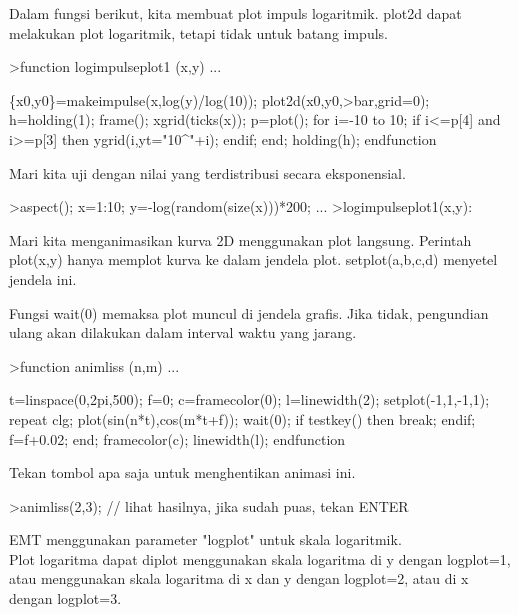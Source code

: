 \documentclass[a4paper,10pt]{article}
\begin{document}
\begin{eulernotebook}
\begin{eulercomment}
\begin{eulercomment}
\begin{eulercomment}
\begin{eulercomment}
\begin{eulercomment}
\begin{eulercomment}
\begin{eulercomment}
\begin{eulercomment}
\begin{eulercomment}
Dalam fungsi berikut, kita membuat plot impuls logaritmik. plot2d
dapat melakukan plot logaritmik, tetapi tidak untuk batang impuls.
\end{eulercomment}
\begin{eulerprompt}
>function logimpulseplot1 (x,y) ...
\end{eulerprompt}
\begin{eulerudf}
    \{x0,y0\}=makeimpulse(x,log(y)/log(10));
    plot2d(x0,y0,>bar,grid=0);
    h=holding(1);
    frame();
    xgrid(ticks(x));
    p=plot();
    for i=-10 to 10;
      if i<=p[4] and i>=p[3] then
         ygrid(i,yt="10^"+i);
      endif;
    end;
    holding(h);
  endfunction
\end{eulerudf}
\begin{eulercomment}
Mari kita uji dengan nilai yang terdistribusi secara eksponensial.
\end{eulercomment}
\begin{eulerprompt}
>aspect(); x=1:10; y=-log(random(size(x)))*200; ...
>logimpulseplot1(x,y):
\end{eulerprompt}
\begin{eulercomment}
Mari kita menganimasikan kurva 2D menggunakan plot langsung. Perintah
plot(x,y) hanya memplot kurva ke dalam jendela plot. setplot(a,b,c,d)
menyetel jendela ini.

Fungsi wait(0) memaksa plot muncul di jendela grafis. Jika tidak,
pengundian ulang akan dilakukan dalam interval waktu yang jarang.
\end{eulercomment}
\begin{eulerprompt}
>function animliss (n,m) ...
\end{eulerprompt}
\begin{eulerudf}
  t=linspace(0,2pi,500);
  f=0;
  c=framecolor(0);
  l=linewidth(2);
  setplot(-1,1,-1,1);
  repeat
    clg;
    plot(sin(n*t),cos(m*t+f));
    wait(0);
    if testkey() then break; endif;
    f=f+0.02;
  end;
  framecolor(c);
  linewidth(l);
  endfunction
\end{eulerudf}
\begin{eulercomment}
Tekan tombol apa saja untuk menghentikan animasi ini.
\end{eulercomment}
\begin{eulerprompt}
>animliss(2,3); // lihat hasilnya, jika sudah puas, tekan ENTER
\end{eulerprompt}
\begin{eulercomment}
EMT menggunakan parameter "logplot" untuk skala logaritmik.\\
Plot logaritma dapat diplot menggunakan skala logaritma di y dengan
logplot=1, atau menggunakan skala logaritma di x dan y dengan
logplot=2, atau di x dengan logplot=3.


\end{eulercomment}
\end{eulercomment}
\end{eulercomment}
\end{eulercomment}
\end{eulercomment}
\end{eulercomment}
\end{eulercomment}
\end{eulercomment}
\end{eulercomment}
\end{eulernotebook}
\end{document}
